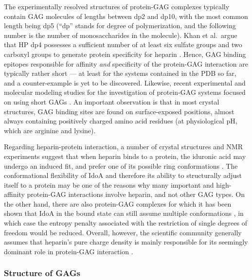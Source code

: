 The experimentally resolved structures of protein-GAG complexes typically
contain GAG molecules of lengths between dp2 and dp10, with the most common
length being dp5 (\enquote{dp} stands for degree of polymerization, and the
following number is the number of monosaccharides in the molecule). Khan et al.\
argue that HP dp4 possesses a sufficient number of at least six sulfate groups
and two carboxyl groups to generate protein specificity for heparin
\cite{semi_rigid_heparin_structures_2010}. Hence, GAG binding epitopes
responsible for affinity \textit{and} specificity of the protein-GAG interaction
are typically rather short --- at least for the systems contained in the PDB so
far, and a counter-example is yet to be discovered. Likewise, recent
experimental and molecular modeling studies for the investigation of protein-GAG
systems focused on using short GAGs \cite{pichert_characterization_2012,
hintze_sergey_2014, gandhi_coombe_2008, Gandhi01102009,
mancera_gandhi_jcim_2011, agostino_mancera_gandhi_2014}. An important
observation is that in most crystal structures, GAG binding sites are found on
surface-exposed positions, almost always containing positively charged amino
acid residues (at physiological pH, which are arginine and lysine).

Regarding heparin-protein interaction, a number of crystal structures and NMR
experiments suggest that when heparin binds to a protein, the iduronic acid may
undergo an induced fit, and prefer one of its possible ring conformations
\cite{gandhi_structure_2008}. The conformational flexibility of IdoA and
therefore its ability to structurally adjust itself to a protein may be one of
the reasons why many important and high-affinity protein-GAG interactions
involve heparin, and not other GAG types. On the other hand, there are also
protein-GAG complexes for which it has been shown that IdoA in the bound state
can still assume multiple conformations \cite{barbero_jacs_2005}, in which case
the entropy penalty associated with the restriction of single degrees of freedom
would be reduced. Overall, however, the scientific community generally assumes
that heparin's pure charge density is mainly responsible for its seemingly
dominant role in protein-GAG interaction \cite{gandhi_structure_2008,
essentials_glycobiology_protgags_2009}.



\subsubsection{Structure of GAGs}

